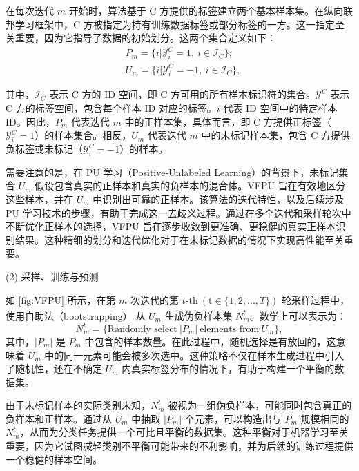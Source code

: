 在每次迭代 $m$ 开始时，算法基于 C 方提供的标签建立两个基本样本集。在纵向联邦学习框架中，C 方被指定为持有训练数据标签或部分标签的一方。这一指定至关重要，因为它指导了数据的初始划分。这两个集合定义如下：
\begin{equation}
	\begin{split}
		&{{P}_{m}}=\{i|\mathsf{\mathcal{Y}}_{i}^{C}=1,\ i\in {{\mathsf{\mathcal{I}}}_{C}}\};\\
		&{{U}_{m}}=\{i|\mathsf{\mathcal{Y}}_{i}^{C}=-1,\ i\in {{\mathsf{\mathcal{I}}}_{C}}\},
	\end{split}
\end{equation}

其中，${{\mathsf{\mathcal{I}}}_{C}}$ 表示 C 方的 ID 空间，即 C 方可用的所有样本标识符的集合。${{\mathsf{\mathcal{Y}}}^{C}}$ 表示 C 方的标签空间，包含每个样本 ID 对应的标签。$i$ 代表 ID 空间中的特定样本 ID。因此，${{P}_{m}}$ 代表迭代 $m$ 中的正样本集，具体而言，即 C 方提供正标签（$\mathsf{\mathcal{Y}}_{i}^{C}=1$）的样本集合。相反，${{U}_{m}}$ 代表迭代 $m$ 中的未标记样本集，包含 C 方提供负标签或未标记（$\mathsf{\mathcal{Y}}_{i}^{C}=-1$）的样本。

需要注意的是，在 PU 学习（Positive-Unlabeled Learning）的背景下，未标记集合 ${{U}_{m}}$ 假设包含真实的正样本和真实的负样本的混合体。VFPU 旨在有效地区分这些样本，并在 ${{U}_{m}}$ 中识别出可靠的正样本。该算法的迭代特性，以及后续涉及 PU 学习技术的步骤，有助于完成这一去歧义过程。通过在多个迭代和采样轮次中不断优化正样本的选择，VFPU 旨在逐步收敛到更准确、更稳健的真实正样本识别结果。这种精细的划分和迭代优化对于在未标记数据的情况下实现高性能至关重要。

(2) 采样、训练与预测

如 \ref{fig:VFPU} 所示，在第 $m$ 次迭代的第 $t\text{-th} \ (\text{t}\in \{1,2,...,T\})$ 轮采样过程中，使用自助法（bootstrapping）\textsuperscript{\cite{mordelet2014bagging}} 从 $U_{m}$ 生成伪负样本集 $N_{m}^{t}$。数学上可以表示为：
\begin{equation}
	N_{m}^{t}=\{ \text{Randomly select} \ |P_{m}| \ \text{elements from} \ U_{m} \},
\end{equation}
其中，$|P_{m}|$ 是 $P_{m}$ 中包含的样本数量。在此过程中，随机选择是有放回的，这意味着 $U_{m}$ 中的同一元素可能会被多次选中。这种策略不仅在样本生成过程中引入了随机性，还在不确定 $U_{m}$ 内真实标签分布的情况下，有助于构建一个平衡的数据集。

由于未标记样本的实际类别未知，$N_{m}^{t}$ 被视为一组伪负样本，可能同时包含真正的负样本和正样本。通过从 $U_{m}$ 中抽取 $|P_{m}|$ 个元素，可以构造出与 $P_{m}$ 规模相同的 $N_{m}^{t}$，从而为分类任务提供一个可比且平衡的数据集。这种平衡对于机器学习至关重要，因为它试图减轻类别不平衡可能带来的不利影响，并为后续的训练过程提供一个稳健的样本空间。

